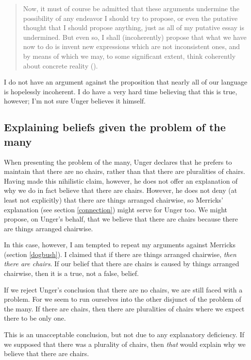 \documentclass[11pt]{article}
\newenvironment{squote}{%
	\begin{quote}\begin{singlespace}%
	}{%
	\end{singlespace}\end{quote}}
\begin{document}
\begin{spacing}{1.5}
\begin{squote}
Now, it must of course be admitted that these arguments undermine the
possibility of any endeavor I should try to propose, or even the
putative thought that I should propose anything, just as all of my
putative essay is undermined.  But even so, I shall (incoherently)
propose that what we have now to do is invent new expressions which
are not inconsistent ones, and by means of which we may, to some
significant extent, think coherently about concrete reality
(\citeyear[544]{unger1980b}).
\end{squote}

I do not have an argument against the proposition that nearly all of
our language is hopelessly incoherent.  I do have a very hard time
believing that this is true, however; I'm not sure Unger believes it
himself.

\subsection{Explaining beliefs given the problem of the many}
\label{expl-many}
When presenting the problem of the many, Unger declares that he
prefers to maintain that there are no chairs, rather than that there
are pluralities of chairs.  Having made this nihilistic claim,
however, he does not offer an explanation of why we do in fact believe
that there are chairs.  However, he does not deny (at least not
explicitly) that there are things arranged chairwise, so Merricks'
explanation (see section \ref{connection}) might serve for Unger too.
We might propose, on Unger's behalf, that we believe that there are
chairs because there are things arranged chairwise.

In this case, however, I am tempted to repeat my arguments against
Merricks (section \ref{dogbush}).  I claimed that if there are things
arranged chairwise, {\em then there are chairs}.  If our belief that
there are chairs is caused by things arranged chairwise, then it is a
true, not a false, belief.

If we reject Unger's conclusion that there are no chairs, we are still
faced with a problem.  For we seem to run ourselves into the other
disjunct of the problem of the many.  If there are chairs, then there
are pluralities of chairs where we expect there to be only one.

This is an unacceptable conclusion, but not due to any explanatory
deficiency.  If we supposed that there was a plurality of chairs, then
{\em that} would explain why we believe that there are chairs.


\end{spacing}
\end{document}

